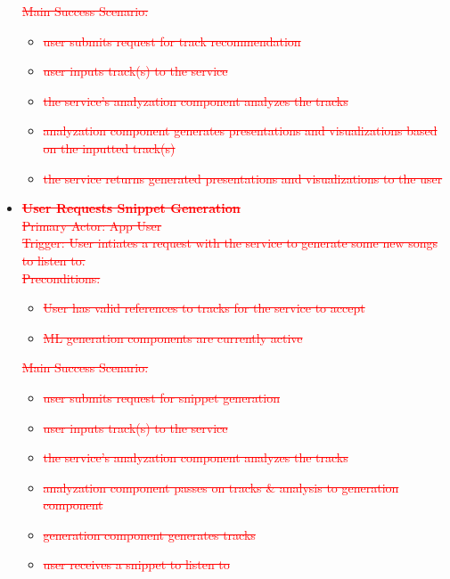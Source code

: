 \documentclass[12pt]{article}
\begin{document}
\begin{itemize}
    \textcolor{red}{\sout{Main Success Scenario: }}
    \begin{itemize}
    \item \textcolor{red}{\sout{user submits request for track recommendation}}
    \item \textcolor{red}{\sout{user inputs track(s) to the service}}
    \item \textcolor{red}{\sout{the service's analyzation component analyzes the tracks}}
    \item \textcolor{red}{\sout{analyzation component generates presentations and visualizations based on the inputted track(s)}}
    \item \textcolor{red}{\sout{the service returns generated presentations and visualizations to the user}}
    \end{itemize}
  
  \item \textcolor{red}{\sout{\textbf{User Requests Snippet Generation}}}
    \\\textcolor{red}{\sout{Primary Actor: App User}}
    \\\textcolor{red}{\sout{Trigger: User intiates a request with the service to generate some new songs to listen to. }}
    \\\textcolor{red}{\sout{Preconditions: }}
    \begin{itemize}
    \item \textcolor{red}{\sout{User has valid references to tracks for the service to accept}}
    \item \textcolor{red}{\sout{ML generation components are currently active}}
    \end{itemize}

    \textcolor{red}{\sout{ Main Success Scenario: }}
    \begin{itemize}
    \item \textcolor{red}{\sout{user submits request for snippet generation}}
    \item \textcolor{red}{\sout{user inputs track(s) to the service}}
    \item \textcolor{red}{\sout{the service's analyzation component analyzes the tracks}}
    \item \textcolor{red}{\sout{analyzation component passes on tracks \& analysis to generation component}}
    \item \textcolor{red}{\sout{generation component generates tracks}}
    \item \textcolor{red}{\sout{user receives a snippet to listen to}}
    \end{itemize}
\end{itemize}
\end{document}
